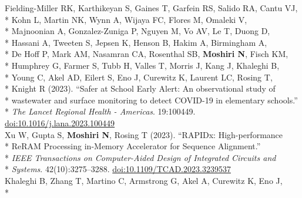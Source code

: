 \documentclass[margin,line]{res}
\begin{document}
\begin{resume}
\hspace*{4mm} Fielding-Miller RK, Karthikeyan S, Gaines T, Garfein RS, Salido RA, Cantu VJ,\\*
\hspace*{9.5mm} Kohn L, Martin NK, Wynn A, Wijaya FC, Flores M, Omaleki V,\\*
\hspace*{9.5mm} Majnoonian A, Gonzalez-Zuniga P, Nguyen M, Vo AV, Le T, Duong D,\\*
\hspace*{9.5mm} Hassani A, Tweeten S, Jepsen K, Henson B, Hakim A, Birmingham A,\\*
\hspace*{9.5mm} De Hoff P, Mark AM, Nasamran CA, Rosenthal SB, \textbf{Moshiri N}, Fisch KM,\\*
\hspace*{9.5mm} Humphrey G, Farmer S, Tubb H, Valles T, Morris J, Kang J, Khaleghi B,\\*
\hspace*{9.5mm} Young C, Akel AD, Eilert S, Eno J, Curewitz K, Laurent LC, Rosing T,\\*
\hspace*{9.5mm} Knight R (2023). ``Safer at School Early Alert: An observational study of\\*
\hspace*{9.5mm} wastewater and surface monitoring to detect COVID-19 in elementary schools.''\\*\vspace{2mm}
\hspace*{8mm} \textit{The Lancet Regional Health - Americas}. 19:100449. \href{https://doi.org/10.1016/j.lana.2023.100449}{doi:10.1016/j.lana.2023.100449}\\
\hspace*{4mm} Xu W, Gupta S, \textbf{Moshiri N}, Rosing T (2023). ``RAPIDx: High-performance\\*
\hspace*{9.5mm} ReRAM Processing in-Memory Accelerator for Sequence Alignment.''\\*
\hspace*{9.5mm} \textit{IEEE Transactions on Computer-Aided Design of Integrated Circuits and}\\*\vspace{2mm}
\hspace*{8mm} \textit{Systems}. 42(10):3275--3288. \href{https://doi.org/10.1109/TCAD.2023.3239537}{doi:10.1109/TCAD.2023.3239537}\\
\hspace*{4mm} Khaleghi B, Zhang T, Martino C, Armstrong G, Akel A, Curewitz K, Eno J,\\*

\end{resume}
\end{document}
